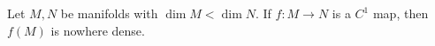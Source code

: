 Let $M, N$ be manifolds with $\dim M < \dim N$. If $f: M \to N$ is a $C^1$ map, then $f(M)$ is nowhere dense.
